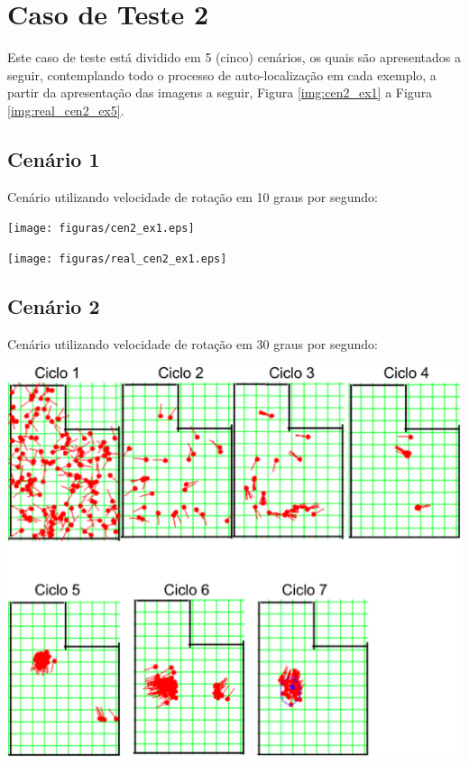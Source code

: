 \section{Caso de Teste 2}
\label{sec:cenario2}

Este caso de teste está dividido em 5 (cinco) cenários, os quais são apresentados a seguir, contemplando todo o processo de auto-localização
em cada exemplo, a partir da apresentação das imagens a seguir, Figura \ref{img:cen2_ex1} a Figura \ref{img:real_cen2_ex5}.

\subsection{Cenário 1}

Cenário utilizando velocidade de rotação em 10 graus por segundo:

{\centering
\texttt{[image: figuras/cen2\_ex1.eps]}
\label{img:cen2_ex1}
\par}

{\centering
\texttt{[image: figuras/real\_cen2\_ex1.eps]}
\label{img:real_cen2_ex1}
\par}

\subsection{Cenário 2}

Cenário utilizando velocidade de rotação em 30 graus por segundo:

{\centering
\includegraphics[scale=0.4]{figuras/cen2_ex2.eps}
\label{img:cen2_ex2}
\par}

